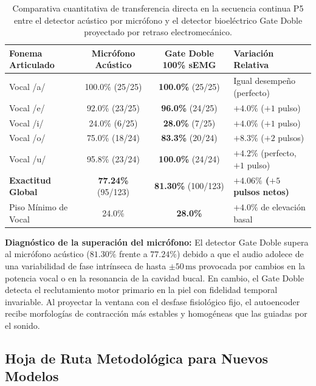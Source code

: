 \documentclass[11pt,a4paper]{article}
\begin{document}
\begin{table}[H]
\centering
\begin{tabularx}{\textwidth}{p{4.5cm} c c X}
\toprule
\textbf{Fonema Articulado} & \textbf{Micrófono Acústico} & \textbf{Gate Doble 100\% sEMG} & \textbf{Variación Relativa} \\
\midrule
Vocal /a/ & 100.0\% (25/25) & \textbf{100.0\%} (25/25) & Igual desempeño (perfecto) \\
Vocal /e/ & 92.0\% (23/25) & \textbf{96.0\%} (24/25) & $+4.0\%$ ($+1$ pulso) \\
Vocal /i/ & 24.0\% (6/25) & \textbf{28.0\%} (7/25) & $+4.0\%$ ($+1$ pulso) \\
Vocal /o/ & 75.0\% (18/24) & \textbf{83.3\%} (20/24) & $+8.3\%$ ($+2$ pulsos) \\
Vocal /u/ & 95.8\% (23/24) & \textbf{100.0\%} (24/24) & $+4.2\%$ (perfecto, $+1$ pulso) \\
\midrule
\textbf{Exactitud Global} & \textbf{77.24\%} (95/123) & \textbf{81.30\%} (100/123) & \textbf{$+4.06\%$ ($+5$ pulsos netos)} \\
Piso Mínimo de Vocal & 24.0\% & \textbf{28.0\%} & $+4.0\%$ de elevación basal \\
\bottomrule
\end{tabularx}
\caption{Comparativa cuantitativa de transferencia directa en la secuencia continua P5 entre el detector acústico por micrófono y el detector bioeléctrico Gate Doble proyectado por retraso electromecánico.}
\label{tab:comparativa_gate_doble}
\end{table}

\textbf{Diagnóstico de la superación del micrófono:}
El detector Gate Doble supera al micrófono acústico ($81.30\%$ frente a $77.24\%$) debido a que el audio adolece de una variabilidad de fase intrínseca de hasta $\pm 50\,\text{ms}$ provocada por cambios en la potencia vocal o en la resonancia de la cavidad bucal. En cambio, el Gate Doble detecta el reclutamiento motor primario en la piel con fidelidad temporal invariable. Al proyectar la ventana con el desfase fisiológico fijo, el autoencoder recibe morfologías de contracción más estables y homogéneas que las guiadas por el sonido.

\subsection{Hoja de Ruta Metodológica para Nuevos Modelos}
\label{subsec:hoja_ruta_gate_doble}
\end{document}

